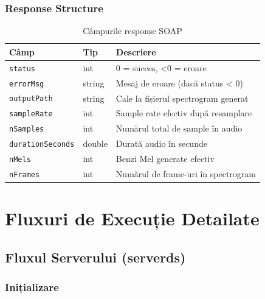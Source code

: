 \documentclass[12pt,a4paper,oneside]{book}
\begin{document}
\subsection{Response Structure}

\begin{table}[H]
\centering
\begin{tabularx}{\textwidth}{|l|l|X|}
\hline
\textbf{Câmp} & \textbf{Tip} & \textbf{Descriere} \\
\hline
\texttt{status} & int & 0 = succes, <0 = eroare \\
\hline
\texttt{errorMsg} & string & Mesaj de eroare (dacă status < 0) \\
\hline
\texttt{outputPath} & string & Cale la fișierul spectrogram generat \\
\hline
\texttt{sampleRate} & int & Sample rate efectiv după resamplare \\
\hline
\texttt{nSamples} & int & Numărul total de sample în audio \\
\hline
\texttt{durationSeconds} & double & Durată audio în secunde \\
\hline
\texttt{nMels} & int & Benzi Mel generate efectiv \\
\hline
\texttt{nFrames} & int & Numărul de frame-uri în spectrogram \\
\hline
\end{tabularx}
\caption{Câmpurile response SOAP}
\end{table}

\newpage

\chapter{Fluxuri de Execuție Detailate}

\section{Fluxul Serverului (serverds)}

\subsection{Inițializare}
\end{document}
